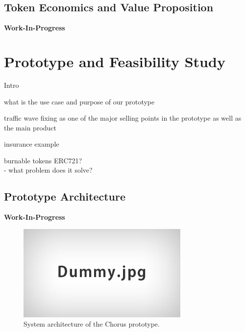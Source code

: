 \documentclass{llncs}
\begin{document}
{		%

		\subsection{Token Economics and Value Proposition}
			\label{ss:token-economics}

			\textbf{Work-In-Progress}
			
					


	\section{Prototype and Feasibility Study}
		\label{s:section-6}	
			
		Intro
		
		what is the use case and purpose of our prototype
		
		traffic wave fixing as one of the major selling points in the prototype as well as the main product
		
		insurance example
		
		burnable tokens ERC721?\\
		
		- what problem does it solve?		
		
		
		\subsection{Prototype Architecture}
			\label{ss:protoype}				

			\textbf{Work-In-Progress}

			\begin{figure}[H]
				\centering
				\includegraphics[scale=0.4]{Figures/Dummy.jpg}
				\caption{System architecture of the Chorus prototype.}	
				\label{fig:prototype-system-architecture}
			\end{figure}
	
}
\end{document}

